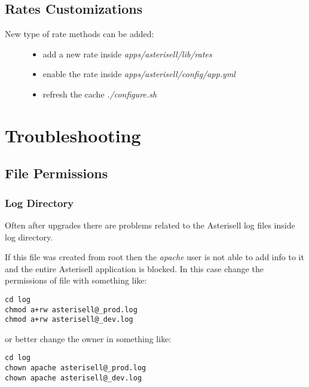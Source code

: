 \documentclass[letterpaper,10pt,english]{sphinxmanual}
\begin{document}
\subsection{Rates Customizations}
\label{index:rates-customizations}\begin{description}
\item[{New type of rate methods can be added:}] \leavevmode\begin{itemize}
\item {} 
add a new rate inside \emph{apps/asterisell/lib/rates}

\item {} 
enable the rate inside \emph{apps/asterisell/config/app.yml}

\item {} 
refresh the cache \emph{./configure.sh}

\end{itemize}

\end{description}


\section{Troubleshooting}
\label{index:troubleshooting}

\subsection{File Permissions}
\label{index:file-permissions}

\subsubsection{Log Directory}
\label{index:log-directory}
Often after upgrades there are problems related to the Asterisell log files inside log directory.

If this file was created from root then the \emph{apache} user is not able to add info to it and the entire Asterisell application is blocked. In this case change the permissions of file with something like:

\begin{Verbatim}[commandchars=@\[\]]
cd log
chmod a+rw asterisell@_prod.log
chmod a+rw asterisell@_dev.log
\end{Verbatim}

or better change the owner in something like:

\begin{Verbatim}[commandchars=@\[\]]
cd log
chown apache asterisell@_prod.log
chown apache asterisell@_dev.log
\end{Verbatim}
\end{document}
